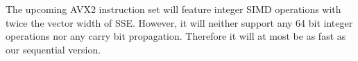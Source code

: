 \documentclass[oribibl]{llncs2e/llncs}
\begin{document}
The upcoming AVX2 instruction set will feature integer SIMD operations with twice the vector width of SSE. However, it will neither support any 64 bit integer operations nor any carry bit propagation. Therefore it will at most be as fast as our sequential version.

\end{document}
